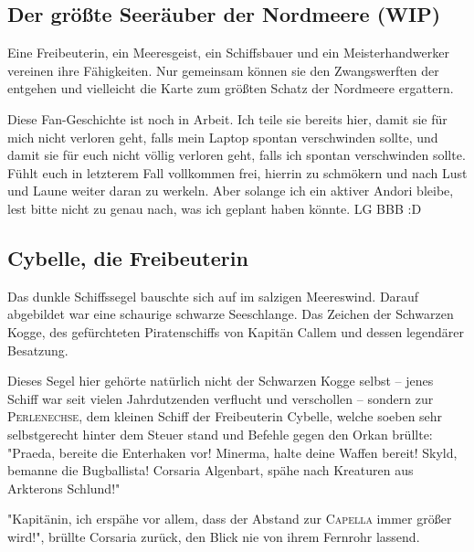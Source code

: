 \begin{chapterbox}
    \chapter{Der größte Seeräuber der Nordmeere (WIP)}
    \label{wip-der-groesste-seeraeuber-der-nordmeere}
    
    Eine Freibeuterin, ein Meeresgeist, ein Schiffsbauer und ein Meisterhandwerker vereinen ihre Fähigkeiten. Nur gemeinsam können sie den Zwangswerften der  entgehen und vielleicht die Karte zum größten Schatz der Nordmeere ergattern.
\end{chapterbox}



Diese Fan-Geschichte ist noch in Arbeit. Ich teile sie bereits hier, damit sie für mich nicht verloren geht, falls mein Laptop spontan verschwinden sollte, und damit sie für euch nicht völlig verloren geht, falls ich spontan verschwinden sollte. Fühlt euch in letzterem Fall vollkommen frei, hierrin zu schmökern und nach Lust und Laune weiter daran zu werkeln. Aber solange ich ein aktiver Andori bleibe, lest bitte nicht zu genau nach, was ich geplant haben könnte. LG BBB :D



\newpage
\section{Cybelle, die Freibeuterin}

Das dunkle Schiffssegel bauschte sich auf im salzigen Meereswind. Darauf abgebildet war eine schaurige schwarze Seeschlange. Das Zeichen der Schwarzen Kogge, des gefürchteten Piratenschiffs von Kapitän Callem und dessen legendärer Besatzung.

Dieses Segel hier gehörte natürlich nicht der Schwarzen Kogge selbst – jenes Schiff war seit vielen Jahrdutzenden verflucht und verschollen – sondern zur \textsc{Perlenechse}, dem kleinen Schiff der Freibeuterin Cybelle, welche soeben sehr selbstgerecht hinter dem Steuer stand und Befehle gegen den Orkan brüllte: "Praeda, bereite die Enterhaken vor! Minerma, halte deine Waffen bereit! Skyld, bemanne die Bugballista! Corsaria Algenbart, spähe nach Kreaturen aus Arkterons Schlund!"

"Kapitänin, ich erspähe vor allem, dass der Abstand zur \textsc{Capella} immer größer wird!", brüllte Corsaria zurück, den Blick nie von ihrem Fernrohr lassend.

